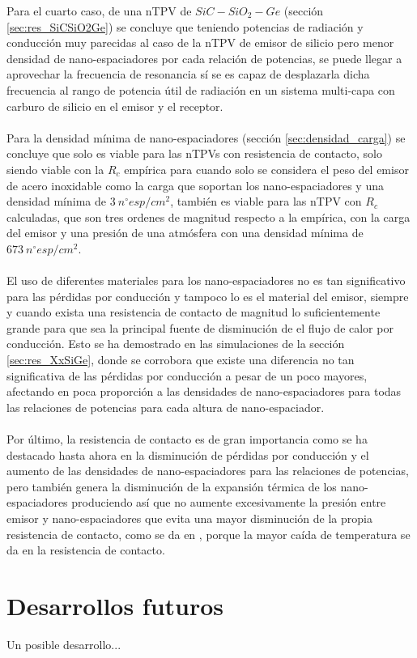 Para el cuarto caso, de una nTPV de $SiC-SiO_2-Ge$ (sección \ref{sec:res_SiCSiO2Ge}) se concluye que teniendo potencias de radiación y conducción muy parecidas al caso de la nTPV de emisor de silicio pero menor densidad de nano-espaciadores por cada relación de potencias, se puede llegar a aprovechar la frecuencia de resonancia sí se es capaz de desplazarla dicha frecuencia al rango de potencia útil de radiación en un sistema multi-capa con carburo de silicio en el emisor y el receptor.\\\\
Para la densidad mínima de nano-espaciadores (sección \ref{sec:densidad_carga}) se concluye que solo es viable para las nTPVs con resistencia de contacto, solo siendo viable con la $R_c$ empírica para cuando solo se considera el peso del emisor de acero inoxidable como la carga que soportan los nano-espaciadores y una densidad mínima de $3 \ n^{\circ}esp/cm^2$, también es viable para las nTPV con $R_c$ calculadas, que son tres ordenes de magnitud respecto a la empírica, con la carga del emisor y una presión de una atmósfera con una densidad mínima de $673 \ n^{\circ}esp/cm^2$.\\\\
El uso de diferentes materiales para los nano-espaciadores no es tan significativo para las pérdidas por conducción y tampoco lo es el material del emisor, siempre y cuando exista una resistencia de contacto de magnitud lo suficientemente grande para que sea la principal fuente de disminución de el flujo de calor por conducción. Esto se ha demostrado en las simulaciones de la sección \ref{sec:res_XxSiGe}, donde se corrobora que existe una diferencia no tan significativa de las pérdidas por conducción a pesar de un poco mayores, afectando en poca proporción a las densidades de nano-espaciadores para todas las relaciones de potencias para cada altura de nano-espaciador.\\\\
Por último, la resistencia de contacto es de gran importancia como se ha destacado hasta ahora en la disminución de pérdidas por conducción y el aumento de las densidades de nano-espaciadores para las relaciones de potencias, pero también genera la disminución de la expansión térmica de los nano-espaciadores produciendo así que no aumente excesivamente la presión entre emisor y nano-espaciadores que evita una mayor disminución de la propia resistencia de contacto, como se da en \cite{experimental_Rc_SS}, porque la mayor caída de temperatura se da en la resistencia de contacto.
\section{Desarrollos futuros}

Un posible desarrollo...